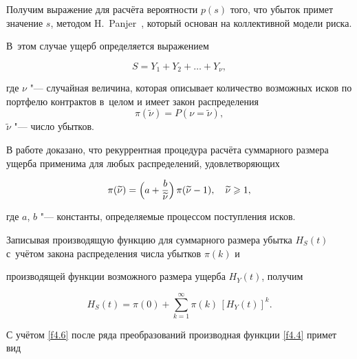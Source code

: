 \smallskip




 Получим выражение для расчёта вероятности $p(s)$ того, что убыток примет значение $s$, методом H.~Panjer~\cite{Mihailova:bib:Panjer}, который основан на коллективной модели риска. 

 В~этом случае ущерб определяется выражением

 \begin{equation}

 \label{f2.2}

S= Y_{1}+ Y_{2}+\ldots + Y_{\nu},

\end{equation}

где $\nu$ "--- случайная величина, которая описывает количество возможных исков по портфелю контрактов в~целом и имеет закон распределения $$\pi(\widetilde{\nu})=P(\nu=\widetilde{\nu}),$$ $\widetilde{\nu}$ "--- число убытков.



В работе \cite{Mihailova:bib:Panjer} доказано, что рекуррентная процедура расчёта суммарного размера ущерба применима для любых распределений, удовлетворяющих 

\begin{equation}

\label{f4.6}

\pi(\widetilde{\nu})=\Bigl(a+\frac{b}{\widetilde{\nu}}\Bigr) \, \pi(\widetilde{\nu}-1),\quad  \widetilde{\nu}\geqslant 1,

\end{equation} 

где $a$, $b$ "--- константы, определяемые процессом поступления исков.



Записывая производящую функцию для суммарного размера убытка $H_S(t)$ с~учётом закона распределения числа убытков $\pi (k)$ и

производящей функции возможного размера ущерба $H_Y(t)$, получим

\begin{equation}

\label{f4.4}

H_S(t)=\pi(0)+\sum_{k=1}^\infty\pi(k)\, [H_Y(t)]^k.

\end{equation}

С учётом \eqref{f4.6} после ряда преобразований производная функции \eqref{f4.4} примет вид

